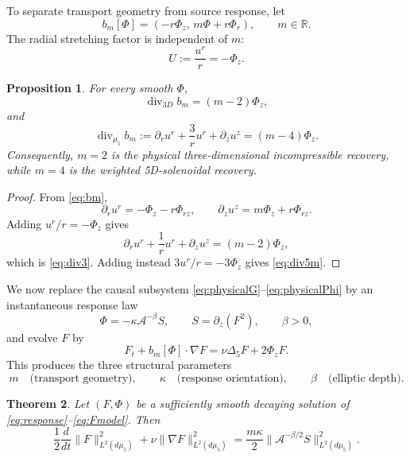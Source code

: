 \documentclass[11pt]{article}
\newtheorem{theorem}{Theorem}[section]
\newtheorem{proposition}[theorem]{Proposition}
\theoremstyle{definition}
\newcommand{\R}{\mathbb R}
\newcommand{\A}{\mathcal A}
\begin{document}
To separate transport geometry from source response, let
\begin{equation}\label{eq:bm}
 b_m[\Phi]=(-r\Phi_z,\,m\Phi+r\Phi_r),
 \qquad m\in\R.
\end{equation}
The radial stretching factor is independent of $m$:
\begin{equation}\label{eq:U}
 U:=\frac{u^r}{r}=-\Phi_z.
\end{equation}

\begin{proposition}\label{prop:divergences}
For every smooth $\Phi$,
\begin{equation}\label{eq:div3}
 \operatorname{div}_{3D}b_m=(m-2)\Phi_z,
\end{equation}
and
\begin{equation}\label{eq:div5m}
 \operatorname{div}_{\mu_5}b_m
 :=\partial_ru^r+\frac3r u^r+\partial_zu^z
 =(m-4)\Phi_z.
\end{equation}
Consequently, $m=2$ is the physical three-dimensional incompressible recovery, while $m=4$ is the weighted 5D-solenoidal recovery.
\end{proposition}

\begin{proof}
From \eqref{eq:bm},
\[
 \partial_ru^r=-\Phi_z-r\Phi_{rz},
 \qquad
 \partial_zu^z=m\Phi_z+r\Phi_{rz}.
\]
Adding $u^r/r=-\Phi_z$ gives
\[
 \partial_ru^r+\frac1r u^r+\partial_zu^z
 =(m-2)\Phi_z,
\]
which is \eqref{eq:div3}.  Adding instead $3u^r/r=-3\Phi_z$ gives \eqref{eq:div5m}.
\end{proof}

We now replace the causal subsystem \eqref{eq:physicalG}--\eqref{eq:physicalPhi} by an instantaneous response law
\begin{equation}\label{eq:response}
 \Phi=-\kappa\A^{-\beta}S,
 \qquad
 S=\partial_z(F^2),
 \qquad \beta>0,
\end{equation}
and evolve $F$ by
\begin{equation}\label{eq:Fmodel}
 F_t+b_m[\Phi]\cdot\nabla F
 =\nu\Delta_5F+2\Phi_zF.
\end{equation}
This produces the three structural parameters
\[
 m\quad\text{(transport geometry)},
 \qquad
 \kappa\quad\text{(response orientation)},
 \qquad
 \beta\quad\text{(elliptic depth)}.
\]

\begin{theorem}\label{thm:5denergy}
Let $(F,\Phi)$ be a sufficiently smooth decaying solution of \eqref{eq:response}--\eqref{eq:Fmodel}.  Then
\begin{equation}\label{eq:5denergy}
 \frac12\frac{d}{dt}\|F\|_{L^2(d\mu_5)}^2
 +\nu\|\nabla F\|_{L^2(d\mu_5)}^2
 =\frac{m\kappa}{2}
 \|\A^{-\beta/2}S\|_{L^2(d\mu_5)}^2.
\end{equation}
\end{theorem}
\end{document}
